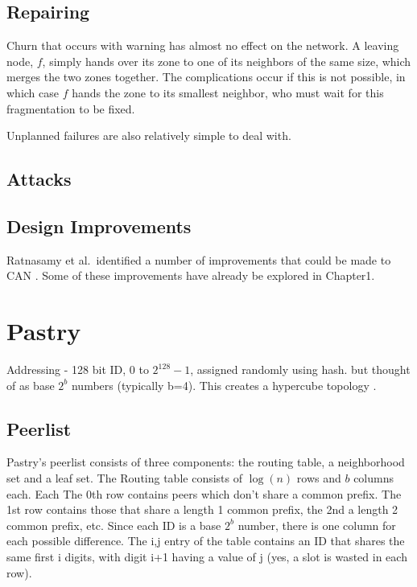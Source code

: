\documentclass[10pt,letterpaper]{report}
\begin{document}
\subsection*{Repairing}
Churn that occurs with warning has almost no effect on the network.
A leaving node, $f$, simply hands over its zone to one of its neighbors of the same size, which merges the two zones together.
The complications occur if this is not possible, in which case  $f$ hands the zone to its smallest neighbor, who must wait for this fragmentation to be fixed.

Unplanned failures are also relatively simple to deal with.


\subsection*{Attacks}








\subsection*{Design Improvements}
Ratnasamy et al.\ identified a number of improvements that could be made to CAN \cite{can}.
Some of these improvements have already be explored in Chapter1.

\section{Pastry}

Addressing - 128 bit ID, 0 to $2^128 -1$, assigned randomly using hash.   but thought of as base $2^b$ numbers (typically b=4).  This creates a hypercube topology \cite{induced}.

\subsection*{Peerlist}
Pastry's peerlist consists of three components: the routing table, a neighborhood set and a leaf set.  The Routing table consists of $\log(n)$ rows and $b$ columns each. Each  
The 0th row contains peers which don't share a common prefix.  The 1st row contains those that share a length 1 common prefix, the 2nd a length 2 common prefix, etc.  Since each ID is a base $2^b$ number, there is one column for each possible difference.   The i,j entry of the table contains an ID that shares the same first i digits, with digit i+1 having a value of j (yes, a slot is wasted in each row).
\end{document}
